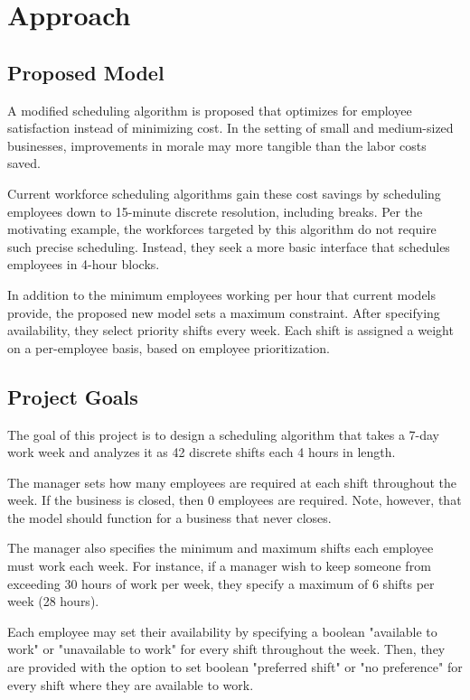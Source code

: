 \chapter{Approach}
\section{Proposed Model}
A modified scheduling algorithm is proposed that optimizes for employee satisfaction instead of minimizing cost. In the setting of small and medium-sized businesses, improvements in morale may more tangible than the labor costs saved.

Current workforce scheduling algorithms gain these cost savings by scheduling employees down to 15-minute discrete resolution, including breaks. Per the motivating example, the workforces targeted by this algorithm do not require such precise scheduling. Instead, they seek a more basic interface that schedules employees in 4-hour blocks. 

In addition to the minimum employees working per hour that current models  provide, the proposed new model sets a maximum constraint. After specifying availability, they select priority shifts every week. Each shift is assigned a weight on a per-employee basis, based on employee prioritization.

\section{Project Goals}

The goal of this project is to design a scheduling algorithm that takes a 7-day work week and analyzes it as 42 discrete shifts each 4 hours in length. 

The manager sets how many employees are required at each shift throughout the week. If the business is closed, then 0 employees are required. Note, however, that the model should function for a business that never closes. 

The manager also specifies the minimum and maximum shifts each employee must work each week. For instance, if a manager wish to keep someone from exceeding 30 hours of work per week, they specify a maximum of 6 shifts per week (28 hours).

Each employee may set their availability by specifying a boolean "available to work" or "unavailable to work" for every shift throughout the week. Then, they are provided with the option to set boolean "preferred shift" or "no preference" for every shift where they are available to work. 


